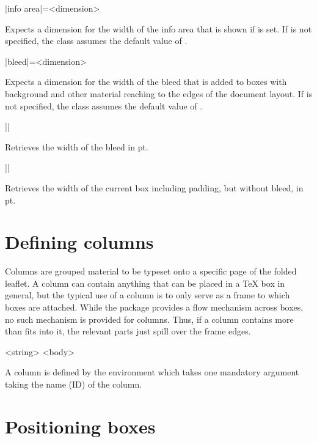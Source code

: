 \documentclass[a4paper]{article}
\begin{document}
\begin{macrodef}
|info area|={<dimension>}
\end{macrodef}
Expects a dimension for the width of the info area that is shown if  is set. If  is not specified, the class assumes the default value of \macro{10mm}.

\begin{macrodef}
|bleed|={<dimension>}
\end{macrodef}
Expects a dimension for the width of the bleed that is added to boxes with background and other material reaching to the edges of the document layout. If  is not specified, the class assumes the default value of \macro{3mm}.

\begin{macrodef}
|\leporellobleed|
\end{macrodef}
Retrieves the width of the bleed in pt.

\begin{macrodef}
|\leporelloboxwidth|
\end{macrodef}
Retrieves the width of the current box including padding, but without bleed, in pt.

\section{Defining columns}

Columns are grouped material to be typeset onto a specific page of the folded leaflet. A column can contain anything that can be placed in a TeX box in general, but the typical use of a column is to only serve as a frame to which boxes are attached. While the package provides a flow mechanism across boxes, no such mechanism is provided for columns. Thus, if a column contains more than fits into it, the relevant parts just spill over the frame edges.

\begin{macrodef}
\null\begin{|leporellocolumn|}{<string>}
  <body>
\end{|leporellocolumn|}
\end{macrodef}
A column is defined by the  environment which takes one mandatory argument taking the name (ID) of the column.

\section{Positioning boxes}
\end{document}

